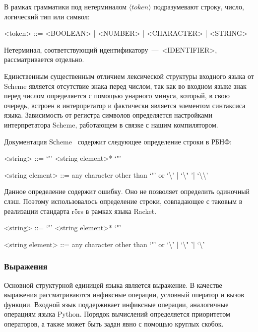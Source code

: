 \documentclass[12pt,a4paper,oneside]{extarticle}
\begin{document}
            В рамках грамматики под нетерминалом $\langle token\rangle$ подразумевают строку, число, логический тип или символ:
            \begin{grammar}
                <token> ::= <BOOLEAN> | <NUMBER> | <CHARACTER> | <STRING>
            \end{grammar}
            Нетерминал, соответствующий идентификатору~---~<IDENTIFIER>, рассматривается отдельно.

            Единственным существенным отличием лексической структуры входного языка от Scheme является отсутствие знака перед числом, так как во входном языке знак перед числом определяется с помощью унарного минуса, который, в свою очередь, встроен в интерпретатор и фактически является элементом синтаксиса языка.
            Зависимость от регистра символов определяется настройками интерпретатора Scheme, работающем в связке с нашим компилятором.            

            Документация Sсheme~\cite{r5rs} содержит следующее определение строки в РБНФ:
            \begin{grammar}
                <string> ::= `"' <string element>* `"'

                <string element> ::= any character other than `"' or `\textbackslash' | `\textbackslash " '| `\textbackslash \textbackslash'
            \end{grammar}
            Данное определение содержит ошибку.
            Оно не позволяет определить одиночный слэш.
            Поэтому использовалось определение строки, совпадающее с таковым в реализации стандарта r5rs в рамках языка Racket. 
            \begin{grammar}
                <string> ::= `"' <string element>* `"'

                <string element> ::= any character other than `"' or `\textbackslash' | `\textbackslash " '| `\textbackslash'
            \end{grammar}

        \subsubsection{Выражения}
            Основной структурной единицей языка является выражение.
            В качестве выражения рассматриваются инфиксные операции, условный оператор и вызов функции.
            Входной язык поддерживает инфиксные операции, аналогичные операциям языка Python.
            Порядок вычислений определяется приоритетом операторов, а также может быть задан явно с помощью круглых скобок.
\end{document}
